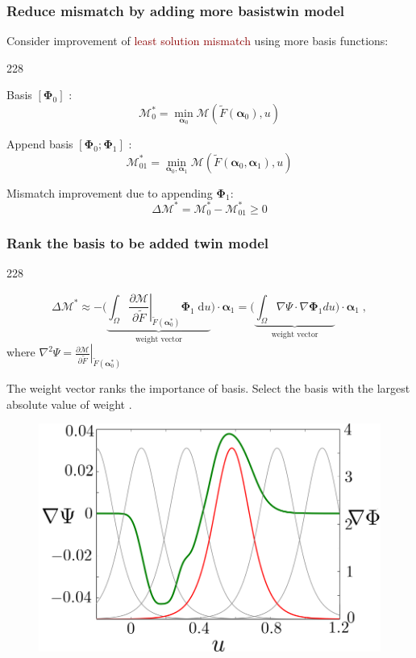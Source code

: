 \documentclass{beamer}
\let\oldcite=\cite
\renewcommand{\cite}[1]{\textcolor[rgb]{.4,.4,.85}{\oldcite{#1}}}
\newcommand{\barrow}{\item[\color{darkred}\ding{228}]}
\begin{document}
\begin{frame}
    \frametitle{Reduce mismatch by adding more basis\hfill \scriptsize{twin model}} \small
    Consider improvement of \textcolor{darkred}{least solution mismatch} using more basis functions:\\
    \begin{dinglist}{228}
    \barrow
    Basis $\left[\boldsymbol{\Phi}_0\right]$ :
    $$
        \mathcal{M}^*_0 = \min_{\boldsymbol{\alpha}_0}
        \mathcal{M}\left(
        \tilde{F}(\boldsymbol{\alpha}_0), u\right)
    $$
    \barrow
    Append basis $\left[ \boldsymbol{\Phi}_0; \boldsymbol{\Phi}_1\right]$ :
    $$
        \mathcal{M}^*_{01} = \min_{
        \boldsymbol{\alpha}_0 , \boldsymbol{\alpha}_1}
        \mathcal{M}\left(
        \tilde{F}(\boldsymbol{\alpha}_0, 
                  \boldsymbol{\alpha}_1), u\right)
    $$
    \barrow
    Mismatch improvement due to appending $\boldsymbol{\Phi}_1$:
    $$
        \Delta\mathcal{M}^*= \mathcal{M}^*_0
        - \mathcal{M}^*_{01} \ge 0
    $$
    \end{dinglist}
\end{frame}


\begin{frame}
    \frametitle{Rank the basis to be added \hfill\scriptsize{twin model}} \small
    \begin{dinglist}{228}
    \barrow
    $$
        \Delta\mathcal{M}^* \approx -\Big(\underbrace{\int_\Omega \left.\frac{\partial\mathcal{M}}{\partial \tilde{F}}
        \right|_{\tilde{F}(\boldsymbol{\alpha}_0^*)} \boldsymbol{\Phi}_1
        \; \textrm{d} u}_{\textrm{weight vector}} \Big) \cdot \boldsymbol{\alpha}_1 
        = \Big( \underbrace{
          \int_\Omega \nabla \Psi \cdot \nabla \boldsymbol{\Phi}_1 d u}_{
          \textrm{weight vector}}\Big) \cdot 
        \boldsymbol{\alpha}_1  \;, 
    $$  
    where $\nabla^2 \Psi = \left.\frac{\partial\mathcal{M}}{\partial \tilde{F}}
        \right|_{\tilde{F}(\boldsymbol{\alpha}_0^*)}$
    \barrow
    The weight vector ranks the importance of basis. Select the basis with the largest absolute value of weight \scriptsize\cite{Miller 90} \small.
    \end{dinglist}
    \begin{figure}[H]\begin{center}
        \includegraphics[width=5.cm]{adaptive_basis.png}
    \end{center}\end{figure}
\end{frame}
\end{document}
